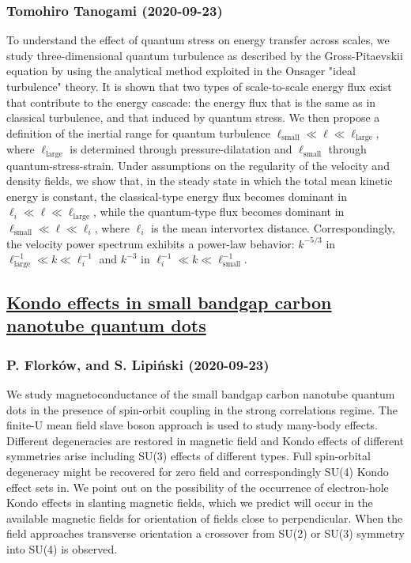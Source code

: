 \subsubsection*{Tomohiro Tanogami (2020-09-23)}
To understand the effect of quantum stress on energy transfer across scales,
we study three-dimensional quantum turbulence as described by the
Gross-Pitaevskii equation by using the analytical method exploited in the
Onsager "ideal turbulence" theory. It is shown that two types of scale-to-scale
energy flux exist that contribute to the energy cascade: the energy flux that
is the same as in classical turbulence, and that induced by quantum stress. We
then propose a definition of the inertial range for quantum turbulence
$\ell_{\mathrm{small}}\ll\ell\ll\ell_{\mathrm{large}}$, where
$\ell_{\mathrm{large}}$ is determined through pressure-dilatation and
$\ell_{\mathrm{small}}$ through quantum-stress-strain. Under assumptions on the
regularity of the velocity and density fields, we show that, in the steady
state in which the total mean kinetic energy is constant, the classical-type
energy flux becomes dominant in $\ell_i\ll\ell\ll\ell_{\mathrm{large}}$, while
the quantum-type flux becomes dominant in
$\ell_{\mathrm{small}}\ll\ell\ll\ell_i$, where $\ell_i$ is the mean intervortex
distance. Correspondingly, the velocity power spectrum exhibits a power-law
behavior: $k^{-5/3}$ in $\ell^{-1}_{\mathrm{large}}\ll k\ll\ell^{-1}_i$ and
$k^{-3}$ in $\ell^{-1}_i\ll k\ll\ell^{-1}_{\mathrm{small}}$.

\subsection*{\href{http://arxiv.org/abs/2009.11052v1}{Kondo effects in small bandgap carbon nanotube quantum dots}}
\subsubsection*{P. Florków, and S. Lipiński (2020-09-23)}
We study magnetoconductance of the small bandgap carbon nanotube quantum dots
in the presence of spin-orbit coupling in the strong correlations regime. The
finite-U mean field slave boson approach is used to study many-body effects.
Different degeneracies are restored in magnetic field and Kondo effects of
different symmetries arise including SU(3) effects of different types. Full
spin-orbital degeneracy might be recovered for zero field and correspondingly
SU(4) Kondo effect sets in. We point out on the possibility of the occurrence
of electron-hole Kondo effects in slanting magnetic fields, which we predict
will occur in the available magnetic fields for orientation of fields close to
perpendicular. When the field approaches transverse orientation a crossover
from SU(2) or SU(3) symmetry into SU(4) is observed.

